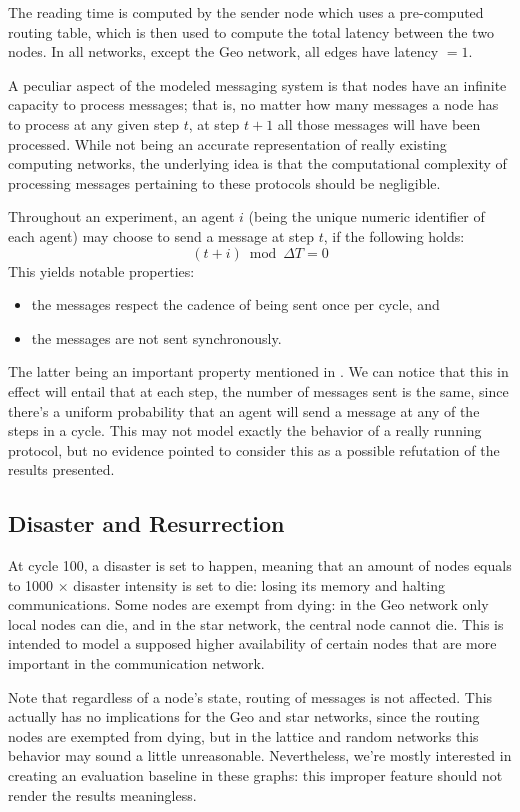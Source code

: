 \documentclass[a4paper]{ifacconf}
\newcommand{\DT}{\ensuremath{{\Delta}T}}
\begin{document}
The reading time is computed by the sender node which uses a pre-computed routing table, which is then used to compute the total latency between the two nodes.
In all networks, except the Geo network, all edges have latency $= 1$.

A peculiar aspect of the modeled messaging system is that nodes have an infinite capacity to process messages; that is, no matter how many messages a node has to process at any given step $t$, at step $t + 1$ all those messages will have been processed.
While not being an accurate representation of really existing computing networks, the underlying idea is that the computational complexity of processing messages pertaining to these protocols should be negligible.

Throughout an experiment, an agent $i$ (being the unique numeric identifier of each agent) may choose to send a message at step $t$, if the following holds:
$$
(t + i) \bmod \DT = 0
$$
This yields notable properties:
\begin{itemize}
    \item the messages respect the cadence of being sent once per cycle, and
    \item the messages are not sent synchronously.
\end{itemize}

The latter being an important property mentioned in \cite[\S2.2]{cyclon}.
We can notice that this in effect will entail that at each step, the number of messages sent is the same, since there's a uniform probability that an agent will send a message at any of the steps in a cycle.
This may not model exactly the behavior of a really running protocol, but no evidence pointed to consider this as a possible refutation of the results presented.

\subsection{Disaster and Resurrection}

At cycle 100, a disaster is set to happen, meaning that an amount of nodes equals to 1000 $\times$ disaster intensity is set to die: losing its memory and halting communications.
Some nodes are exempt from dying: in the Geo network only local nodes can die, and in the star network, the central node cannot die.
This is intended to model a supposed higher availability of certain nodes that are more important in the communication network.

Note that regardless of a node's state, routing of messages is not affected.
This actually has no implications for the Geo and star networks, since the routing nodes are exempted from dying, but in the lattice and random networks this behavior may sound a little unreasonable.
Nevertheless, we're mostly interested in creating an evaluation baseline in these graphs: this improper feature should not render the results meaningless.
\end{document}
